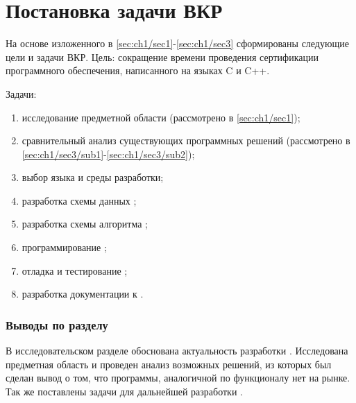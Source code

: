 \section{Постановка задачи ВКР}\label{sec:ch1/sec4}
На основе изложенного в \autoref{sec:ch1/sec1}-\autoref{sec:ch1/sec3} сформированы
следующие цели и задачи ВКР.
Цель: сокращение времени проведения сертификации программного обеспечения, написанного
на языках C и C++.

Задачи:
\begin{enumerate}[label={\arabic*)}]
    \item исследование предметной области (рассмотрено в \autoref{sec:ch1/sec1});
    \item сравнительный анализ существующих программных решений 
        (рассмотрено в \autoref{sec:ch1/sec3/sub1}-\autoref{sec:ch1/sec3/sub2});
    \item выбор языка и среды разработки;
    \item разработка схемы данных {\ProgModule};
    \item разработка схемы алгоритма {\ProgModule};
    \item программирование {\ProgModule};
    \item отладка и тестирование {\ProgModule};
    \item разработка документации к {\ProgModule}.
\end{enumerate}

\subsubsection{Выводы по разделу}\label{sec:ch1/sec5}
В исследовательском разделе обоснована актуальность разработки {\ProgModule}.
Исследована предметная область и проведен анализ возможных решений, из которых был сделан
вывод о том, что программы, аналогичной по функционалу {\ProgModule} нет на рынке.
Так же поставлены задачи для дальнейшей разработки {\ProgModule}.
